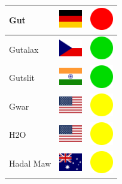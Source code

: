 \documentclass[12pt, a4paper, twoside]{report}
\begin{document}
\begin{center}
\begin{longtable}{|p{5cm}|p{2cm}|p{2cm}|}
			Gut & \includegraphics[width=1cm]{4x3/de} & \includegraphics[width=1cm]{likes/n} \\ \hline
			Gutalax & \includegraphics[width=1cm]{4x3/cz} & \includegraphics[width=1cm]{likes/y} \\ \hline
			Gutslit & \includegraphics[width=1cm]{4x3/in} & \includegraphics[width=1cm]{likes/y} \\ \hline
			Gwar & \includegraphics[width=1cm]{4x3/us} & \includegraphics[width=1cm]{likes/m} \\ \hline
			H2O & \includegraphics[width=1cm]{4x3/us} & \includegraphics[width=1cm]{likes/m} \\ \hline
			Hadal Maw & \includegraphics[width=1cm]{4x3/au} & \includegraphics[width=1cm]{likes/m} \\ \hline

\end{longtable}
\end{center}
\end{document}
